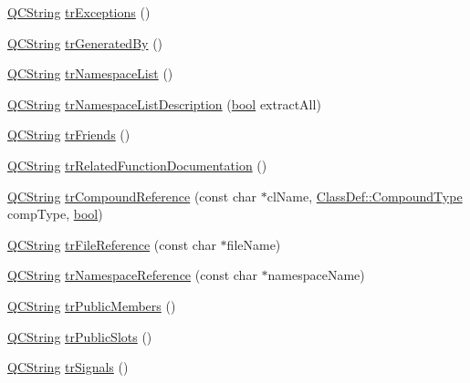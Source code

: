 \begin{DoxyCompactItemize}
\item 
\hyperlink{class_q_c_string}{Q\+C\+String} \hyperlink{class_translator_slovene_ad90577cb41a9a100b5ee214af8144149}{tr\+Exceptions} ()
\item 
\hyperlink{class_q_c_string}{Q\+C\+String} \hyperlink{class_translator_slovene_a9b86c2eaa8346310718a4cf8cde4df87}{tr\+Generated\+By} ()
\item 
\hyperlink{class_q_c_string}{Q\+C\+String} \hyperlink{class_translator_slovene_a7df87eea0a251268a008c2f7d941a66d}{tr\+Namespace\+List} ()
\item 
\hyperlink{class_q_c_string}{Q\+C\+String} \hyperlink{class_translator_slovene_a7827d8947e2e0d2a1a5f8f7e11c071d4}{tr\+Namespace\+List\+Description} (\hyperlink{qglobal_8h_a1062901a7428fdd9c7f180f5e01ea056}{bool} extract\+All)
\item 
\hyperlink{class_q_c_string}{Q\+C\+String} \hyperlink{class_translator_slovene_a11acd96d83a6deb46fde3440ba56939a}{tr\+Friends} ()
\item 
\hyperlink{class_q_c_string}{Q\+C\+String} \hyperlink{class_translator_slovene_a6fc3b643fff34f59d69254ab067e1d23}{tr\+Related\+Function\+Documentation} ()
\item 
\hyperlink{class_q_c_string}{Q\+C\+String} \hyperlink{class_translator_slovene_a2e6ca351e84802282a8c88577fcab52b}{tr\+Compound\+Reference} (const char $\ast$cl\+Name, \hyperlink{class_class_def_ae70cf86d35fe954a94c566fbcfc87939}{Class\+Def\+::\+Compound\+Type} comp\+Type, \hyperlink{qglobal_8h_a1062901a7428fdd9c7f180f5e01ea056}{bool})
\item 
\hyperlink{class_q_c_string}{Q\+C\+String} \hyperlink{class_translator_slovene_aa73ebddc140799f209c16c106b24bb4e}{tr\+File\+Reference} (const char $\ast$file\+Name)
\item 
\hyperlink{class_q_c_string}{Q\+C\+String} \hyperlink{class_translator_slovene_a3d3cfeb920abafff5b80907234994e6b}{tr\+Namespace\+Reference} (const char $\ast$namespace\+Name)
\item 
\hyperlink{class_q_c_string}{Q\+C\+String} \hyperlink{class_translator_slovene_aca9b9f14caa5392b7ad94ea5b4b924fd}{tr\+Public\+Members} ()
\item 
\hyperlink{class_q_c_string}{Q\+C\+String} \hyperlink{class_translator_slovene_af9487f073db060ecbd591f52aca55a6a}{tr\+Public\+Slots} ()
\item 
\hyperlink{class_q_c_string}{Q\+C\+String} \hyperlink{class_translator_slovene_a6c7147bfb4d5d10b00c6c421a56e3257}{tr\+Signals} ()
\item 

\end{DoxyCompactItemize}
